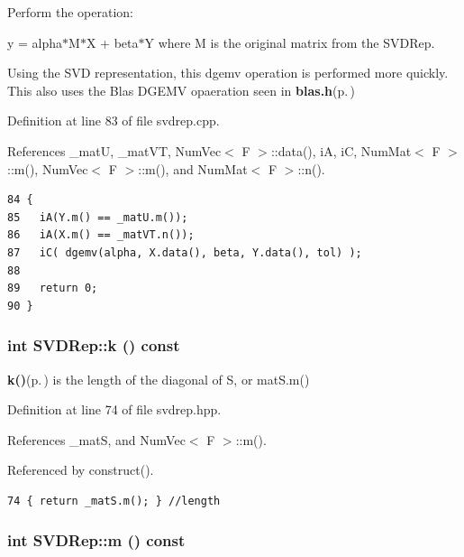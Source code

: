 Perform the operation:

y = alpha$\ast$M$\ast$X + beta$\ast$Y where M is the original matrix from the SVDRep.

Using the SVD representation, this dgemv operation is performed more quickly. This also uses the Blas DGEMV opaeration seen in {\bf blas.h}{\rm (p.\,\pageref{blas_8h})} 

Definition at line 83 of file svdrep.cpp.

References \_\-mat\-U, \_\-mat\-VT, Num\-Vec$<$ F $>$::data(), i\-A, i\-C, Num\-Mat$<$ F $>$::m(), Num\-Vec$<$ F $>$::m(), and Num\-Mat$<$ F $>$::n().

\footnotesize\begin{verbatim}84 {
85   iA(Y.m() == _matU.m());
86   iA(X.m() == _matVT.n());
87   iC( dgemv(alpha, X.data(), beta, Y.data(), tol) );
88   
89   return 0;
90 }
\end{verbatim}\normalsize 


\subsubsection{\setlength{\rightskip}{0pt plus 5cm}int SVDRep::k () const\hspace{0.3cm}{\tt  [inline]}}\label{classSVDRep_9e7409c17d75dde8d3f3f926400ff0b6_9e7409c17d75dde8d3f3f926400ff0b6}


{\bf k()}{\rm (p.\,\pageref{classSVDRep_9e7409c17d75dde8d3f3f926400ff0b6_9e7409c17d75dde8d3f3f926400ff0b6})} is the length of the diagonal of S, or mat\-S.m() 

Definition at line 74 of file svdrep.hpp.

References \_\-mat\-S, and Num\-Vec$<$ F $>$::m().

Referenced by construct().

\footnotesize\begin{verbatim}74 { return _matS.m(); } //length
\end{verbatim}\normalsize 


\subsubsection{\setlength{\rightskip}{0pt plus 5cm}int SVDRep::m () const\hspace{0.3cm}{\tt  [inline]}}\label{classSVDRep_6a2fa69c25bf8ed36e019d0fb3f5e966_6a2fa69c25bf8ed36e019d0fb3f5e966}


